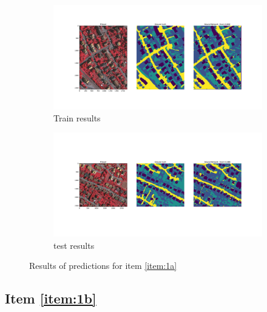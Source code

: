 \documentclass[10pt, a4paper]{article}
\begin{document}
\begin{figure}[htpb]
  \centering
  \begin{subfigure}[b]{1.0\textwidth}
      \centering
      \includegraphics[width=\textwidth]{images/Patch32_imagenet_train.pdf}
      \caption{Train results}
      \label{fig:q1a_train}
  \end{subfigure}
  \hfill
  \begin{subfigure}[b]{1.0\textwidth}
    \centering
    \includegraphics[width=\textwidth]{images/Patch32_imagenet_test.pdf}
    \caption{test results}
    \label{fig:q1a_test}
  \end{subfigure}
  \caption{Results of predictions for item \ref{item:1a}}
  \label{fig:q1a_results}
\end{figure}

\subsection{Item \ref{item:1b}}

\lipsum[1]
\end{document}
